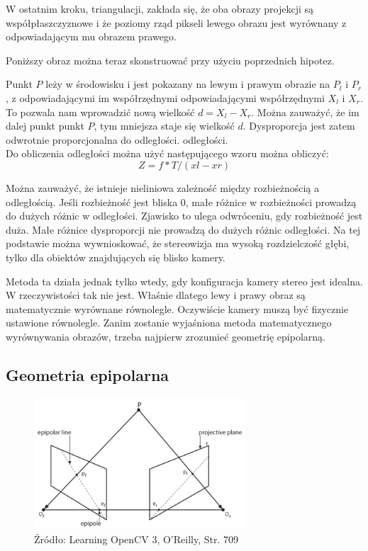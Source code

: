 \documentclass[magisterska]{pracadypl}
\begin{document}
W ostatnim kroku, triangulacji, zakłada się, że oba obrazy projekcji są współpłaszczyznowe i że poziomy rząd pikseli lewego obrazu jest wyrównany z odpowiadającym mu obrazem prawego.

Poniższy obraz można teraz skonstruować przy użyciu poprzednich hipotez.

Punkt $P$ leży w środowisku i jest pokazany na
lewym i prawym obrazie na $P_l$ i $P_r$, z odpowiadającymi im współrzędnymi
odpowiadającymi współrzędnymi $X_l$ i $X_r$. To
pozwala nam wprowadzić nową wielkość
$d = X_l - X_r$. Można zauważyć, że im dalej punkt
punkt $P$, tym mniejsza staje się wielkość $d$. Dysproporcja
jest zatem odwrotnie proporcjonalna do odległości.
odległości.\\
Do obliczenia odległości można użyć następującego wzoru
można obliczyć: \[Z=f*T/(xl-xr)\]

Można zauważyć, że istnieje nieliniowa zależność między rozbieżnością a odległością.
Jeśli rozbieżność jest bliska 0, małe różnice w rozbieżności prowadzą do dużych różnic w odległości.
Zjawisko to ulega odwróceniu, gdy rozbieżność jest duża. Małe różnice dysproporcji nie prowadzą do dużych różnic odległości. Na tej podstawie można wywnioskować, że stereowizja ma wysoką rozdzielczość głębi, tylko dla obiektów znajdujących się blisko kamery.

Metoda ta działa jednak tylko wtedy, gdy konfiguracja kamery stereo jest idealna. W
rzeczywistości tak nie jest. Właśnie dlatego lewy i prawy obraz są
matematycznie wyrównane równolegle. Oczywiście kamery muszą być fizycznie ustawione równolegle.
Zanim zostanie wyjaśniona metoda matematycznego wyrównywania obrazów, trzeba najpierw zrozumieć geometrię epipolarną.

\subsection{Geometria epipolarna}

\begin{figure}[h]  %
    \centering  %
    \includegraphics[width=0.7\textwidth]{images/epipolar.png}  %
    \captionsetup{labelformat=empty, font=footnotesize}
    \caption{Źródło: Learning OpenCV 3, O'Reilly, Str. 709}
    \label{fig:rpi}  %
\end{figure}
\end{document}
